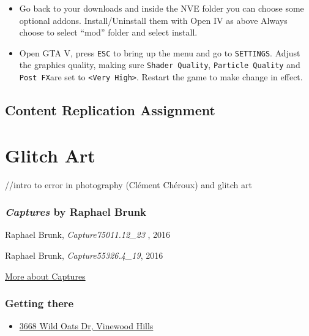 \documentclass[
  openany]{book}
\providecommand{\tightlist}{%
  \setlength{\itemsep}{0pt}\setlength{\parskip}{0pt}}
\begin{document}
\begin{itemize}
\item
  Go back to your downloads and inside the NVE folder you can choose some optional addons. Install/Uninstall them with Open IV as above Always choose to select ``mod'' folder and select install.
\item
  Open GTA V, press \texttt{ESC} to bring up the menu and go to \texttt{SETTINGS}. Adjust the graphics quality, making sure \texttt{Shader\ Quality}, \texttt{Particle\ Quality} and \texttt{Post\ FX}are set to \texttt{\textless{}Very\ High\textgreater{}}. Restart the game to make change in effect.
\end{itemize}

\hypertarget{content-replication-assignment-5}{%
\section*{Content Replication Assignment}\label{content-replication-assignment-5}}

\hypertarget{glitch-art}{%
\chapter{Glitch Art}\label{glitch-art}}

//intro to error in photography (Clément Chéroux) and glitch art

\hypertarget{captures-by-raphael-brunk}{%
\subsection*{\texorpdfstring{\emph{Captures} by Raphael Brunk}{Captures by Raphael Brunk}}\label{captures-by-raphael-brunk}}

Raphael Brunk, \emph{Capture75011.12\_23 }, 2016

Raphael Brunk, \emph{Capture55326.4\_19}, 2016

\href{http://www.darktaxa-project.net/artists/raphael-brunk/}{More about Captures}

\hypertarget{getting-there-9}{%
\subsection*{Getting there}\label{getting-there-9}}

\begin{itemize}
\tightlist
\item
  \href{https://grandtheftdata.com/landmarks/\#-94.207,530.818,5,atlas,name=3668,3668_Wild_Oats_Dr,_Vinewood_Hills}{3668 Wild Oats Dr, Vinewood Hills}
\end{itemize}
\end{document}
